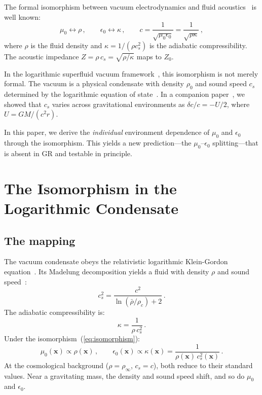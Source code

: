 \documentclass[12pt, a4paper]{article}
\newcommand{\rhob}{\bar{\rho}}
\begin{document}
The formal isomorphism between vacuum
electrodynamics and fluid
acoustics~\cite{landau_fluid} is well known:
\begin{equation}
    \mu_0 \leftrightarrow \rho\,,\qquad
    \epsilon_0 \leftrightarrow \kappa\,,\qquad
    c = \frac{1}{\sqrt{\mu_0\epsilon_0}}
    = \frac{1}{\sqrt{\rho\kappa}}\,,
\label{eq:isomorphism}
\end{equation}
where $\rho$ is the fluid density and
$\kappa = 1/(\rho c_s^2)$ is the adiabatic
compressibility. The acoustic impedance
$Z = \rho\,c_s = \sqrt{\rho/\kappa}$ maps to $Z_0$.

In the logarithmic superfluid vacuum
framework~\cite{kulangiev_gravity,kulangiev_geff},
this isomorphism is not merely formal. The vacuum is
a physical condensate with density $\rho_0$ and
sound speed $c_s$ determined by the logarithmic
equation of state~\cite{zloshchastiev_2023}. In a
companion paper~\cite{kulangiev_variable_c}, we
showed that $c_s$ varies across gravitational
environments as $\delta c/c = -U/2$, where
$U = GM/(c^2 r)$.

In this paper, we derive the \emph{individual}
environment dependence of $\mu_0$ and $\epsilon_0$
through the isomorphism. This yields a new
prediction---the $\mu_0$--$\epsilon_0$
splitting---that is absent in GR and testable in
principle.


\section{The Isomorphism in the Logarithmic Condensate}
\label{sec:isomorphism}

\subsection{The mapping}

The vacuum condensate obeys the relativistic
logarithmic Klein-Gordon
equation~\cite{zloshchastiev_2023,zloshchastiev_2020}.
Its Madelung decomposition yields a fluid with
density $\rho$ and sound
speed~\cite{kulangiev_gravity}:
\begin{equation}
    c_s^2 = \frac{c^2}{\ln(\rhob/\rho_c) + 2}\,.
\label{eq:cs}
\end{equation}
The adiabatic compressibility is:
\begin{equation}
    \kappa = \frac{1}{\rho\,c_s^2}\,.
\label{eq:kappa}
\end{equation}
Under the isomorphism~(\ref{eq:isomorphism}):
\begin{equation}
    \mu_0(\mathbf{x}) \propto \rho(\mathbf{x})\,,
    \qquad
    \epsilon_0(\mathbf{x}) \propto
    \kappa(\mathbf{x})
    = \frac{1}{\rho(\mathbf{x})\,c_s^2(\mathbf{x})}\,.
\label{eq:mapping}
\end{equation}
At the cosmological background
($\rho = \rho_\infty$, $c_s = c$), both reduce to
their standard values. Near a gravitating mass,
the density and sound speed shift, and so do
$\mu_0$ and $\epsilon_0$.
\end{document}
